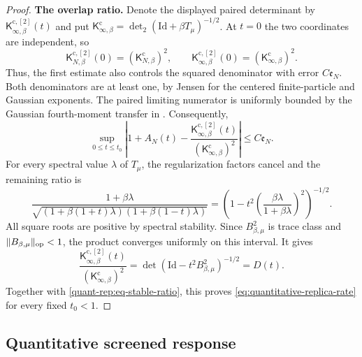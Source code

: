 \documentclass[11pt,reqno]{amsart}
\numberwithin{equation}{section}
\theoremstyle{plain}
\theoremstyle{remark}
\DeclarePairedDelimiter{\norm}{\lVert}{\rVert}
\newcommand{\K}{{\mathsf{K}}}
\newcommand{\be}{\beta}
\newcommand{\detTwo}{\operatorname{det}_2}
\newcommand{\step}[1]{\par\medskip\noindent\textbf{#1}}
\begin{document}
\begin{proof}
\step{The overlap ratio.}
Denote the displayed paired determinant by
$\K^{\mathrm c,[2]}_{\infty,\be}(t)$ and put
$\K^{\mathrm c}_{\infty,\be}=\detTwo(\mathrm{Id}+\be T_\mu)^{-1/2}$.
At $t=0$ the two coordinates are independent, so
\begin{equation}\label{quant-rep:eq-independent-endpoint}
 \K^{\mathrm c,[2]}_{N,\be}(0)=(\K^{\mathrm c}_{N,\be})^2,
 \qquad
 \K^{\mathrm c,[2]}_{\infty,\be}(0)=(\K^{\mathrm c}_{\infty,\be})^2.
\end{equation}
Thus, the first estimate also controls the squared denominator with error
$C\mathfrak e_N$.  Both denominators are at least one, by Jensen for the
centered finite-particle and Gaussian exponents.  The paired limiting
numerator is uniformly bounded by the Gaussian fourth-moment transfer
in .  Consequently,
\begin{equation}\label{quant-rep:eq-stable-ratio}
 \sup_{0\leq t\leq t_0}
 \left|1+A_N(t)-
 \frac{\K^{\mathrm c,[2]}_{\infty,\be}(t)}
      {(\K^{\mathrm c}_{\infty,\be})^2}\right|
 \leq C\mathfrak e_N.
\end{equation}
For every spectral value $\lambda$ of $T_\mu$, the regularization factors
cancel and the remaining ratio is
\begin{equation}\label{quant-rep:eq-mode-ratio}
 \frac{1+\be\lambda}
 {\sqrt{(1+\be(1+t)\lambda)(1+\be(1-t)\lambda)}}
 =\left(1-t^2\left(\frac{\be\lambda}{1+\be\lambda}\right)^2\right)^{-1/2}.
\end{equation}
All square roots are positive by spectral stability.  Since
$B_{\be,\mu}^2$ is trace class and $\norm{B_{\be,\mu}}_{\mathrm{op}}<1$,
the product converges uniformly on this interval.  It gives
\begin{equation}\label{quant-rep:eq-final-det-ratio}
 \frac{\K^{\mathrm c,[2]}_{\infty,\be}(t)}
      {(\K^{\mathrm c}_{\infty,\be})^2}
 =\det(\mathrm{Id}-t^2B_{\be,\mu}^2)^{-1/2}=D(t).
\end{equation}
Together with \eqref{quant-rep:eq-stable-ratio}, this proves
\eqref{eq:quantitative-replica-rate} for every fixed $t_0<1$.
\end{proof}

\subsection{Quantitative screened response}
\label{subsec:screened-response-proof}
\end{document}
